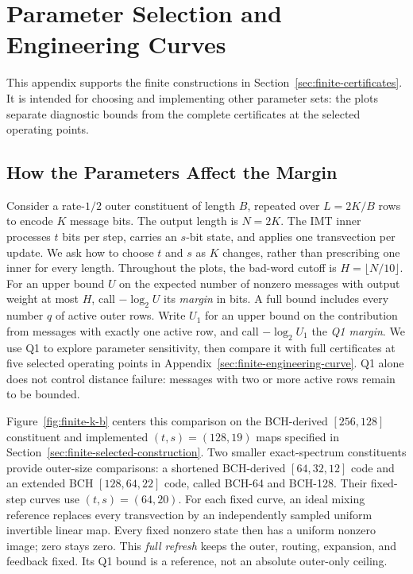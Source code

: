 \section{Parameter Selection and Engineering Curves}
\label{app:engineering}

This appendix supports the finite constructions in
Section~\ref{sec:finite-certificates}. It is intended for choosing and
implementing other parameter sets: the plots separate diagnostic bounds
from the complete certificates at the selected operating points.

\subsection{How the Parameters Affect the Margin}
\label{sec:finite-parameter-slices}

Consider a rate-$1/2$ outer constituent of length $B$, repeated over
$L=2K/B$ rows to encode $K$ message bits. The output length is $N=2K$.
The IMT inner processes $t$ bits per step, carries an $s$-bit state,
and applies one transvection per update. We ask how to choose $t$ and $s$
as $K$ changes, rather than prescribing one inner for every length.
Throughout the plots, the bad-word cutoff is $H=\lfloor N/10\rfloor$.
For an upper bound $U$ on the expected number of nonzero messages with
output weight at most $H$, call $-\log_2U$ its \emph{margin} in bits.
A full bound includes every number $q$ of active outer rows. Write $U_1$
for an upper bound on the contribution from messages with exactly one
active row, and call $-\log_2 U_1$ the \emph{Q1 margin}.
We use Q1 to explore parameter sensitivity, then compare it with full
certificates at five selected operating points in
Appendix~\ref{sec:finite-engineering-curve}. Q1 alone does not control
distance failure: messages with two or more active rows remain to be bounded.

Figure~\ref{fig:finite-k-b} centers this comparison on the BCH-derived
$[256,128]$ constituent and implemented $(t,s)=(128,19)$ maps specified in
Section~\ref{sec:finite-selected-construction}. Two smaller exact-spectrum
constituents provide outer-size comparisons: a shortened BCH-derived
$[64,32,12]$ code and an extended BCH $[128,64,22]$ code, called BCH-64
and BCH-128. Their fixed-step curves use $(t,s)=(64,20)$.
For each fixed curve, an ideal mixing reference replaces every transvection
by an independently sampled uniform invertible linear map. Every fixed
nonzero state then has a uniform nonzero image; zero stays zero.
This \emph{full refresh} keeps the outer, routing, expansion, and feedback
fixed. Its Q1 bound is a reference, not an absolute outer-only ceiling.

